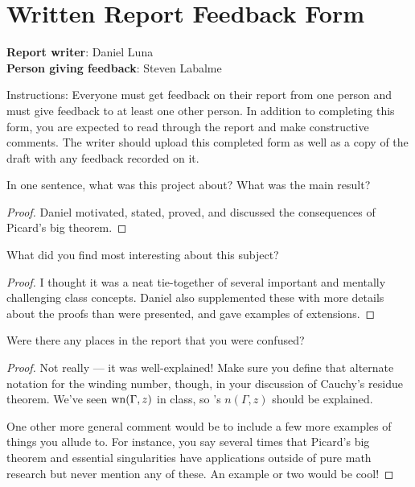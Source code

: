\documentclass[../finalProject.tex]{subfiles}
\begin{document}
\section*{Written Report Feedback Form}
\textbf{Report writer}: Daniel Luna\\
\textbf{Person giving feedback}: Steven Labalme\\
\medskip

\noindent Instructions: Everyone must get feedback on their report from one person and must give feedback to at least one other person. In addition to completing this form, you are expected to read through the report and make constructive comments. The writer should upload this completed form as well as a copy of the draft with any feedback recorded on it.\\
\bigskip

\noindent In one sentence, what was this project about? What was the main result?
\begin{proof}
    Daniel motivated, stated, proved, and discussed the consequences of Picard's big theorem.
\end{proof}
\vspace{3em}

\noindent What did you find most interesting about this subject?
\begin{proof}
    I thought it was a neat tie-together of several important and mentally challenging class concepts. Daniel also supplemented these with more details about the proofs than were presented, and gave examples of extensions.
\end{proof}
\vspace{3em}

\noindent Were there any places in the report that you were confused?
\begin{proof}
    Not really --- it was well-explained! Make sure you define that alternate notation for the winding number, though, in your discussion of Cauchy's residue theorem. We've seen $\operatorname{wn}(\Gamma,z)$ in class, so \textcite{bib:FischerLieb}'s $n(\Gamma,z)$ should be explained.\par
    One other more general comment would be to include a few more examples of things you allude to. For instance, you say several times that Picard's big theorem and essential singularities have applications outside of pure math research but never mention any of these. An example or two would be cool!
\end{proof}
\vspace{3em}
\end{document}
